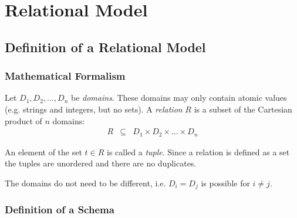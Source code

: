 

\section{Relational Model}

\subsection{Definition of a Relational Model}




\subsubsection{Mathematical Formalism}

Let $D_1, D_2, \ldots, D_n$ be \emph{domains}. These domains may only contain atomic values (e.g. strings and integers, but no sets). A \emph{relation} $R$ is a subset of the Cartesian product of $n$ domains: 
\[ \begin{array}{rcl}
R & \subseteq & D_1 \times D_2 \times \ldots \times D_n
\end{array} \]

An element of the set $t \in R$ is called a \emph{tuple}. Since a relation is defined as a set the tuples are unordered and there are no duplicates.

\begin{note}
The domains do not need to be different, i.e. $D_i = D_j$ is possible for $i \neq j$.
\end{note}




\subsubsection{Definition of a Schema}

